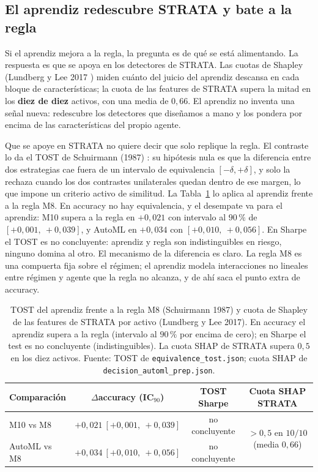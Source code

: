 \subsection{El aprendiz redescubre STRATA y bate a la regla}
\label{sec:mp-panel-tost}

Si el aprendiz mejora a la regla, la pregunta es de qué se está alimentando. La respuesta es que se apoya en los detectores de STRATA. Las cuotas de Shapley (Lundberg y Lee 2017 \cite{lundberg2017}) miden cuánto del juicio del aprendiz descansa en cada bloque de características; la cuota de las features de STRATA supera la mitad en los \textbf{diez de diez} activos, con una media de $0{,}66$. El aprendiz no inventa una señal nueva: redescubre los detectores que diseñamos a mano y los pondera por encima de las características del propio agente.

Que se apoye en STRATA no quiere decir que solo replique la regla. El contraste lo da el TOST de Schuirmann (1987) \cite{schuirmann1987}: su hipótesis nula es que la diferencia entre dos estrategias cae fuera de un intervalo de equivalencia $[-\delta, +\delta]$, y solo la rechaza cuando los dos contrastes unilaterales quedan dentro de ese margen, lo que impone un criterio activo de similitud. La Tabla~\ref{tab:mp-tost} lo aplica al aprendiz frente a la regla M8. En accuracy no hay equivalencia, y el desempate va para el aprendiz: M10 supera a la regla en $+0{,}021$ con intervalo al $90\,\%$ de $[+0{,}001,\ +0{,}039]$, y AutoML en $+0{,}034$ con $[+0{,}010,\ +0{,}056]$. En Sharpe el TOST es no concluyente: aprendiz y regla son indistinguibles en riesgo, ninguno domina al otro. El mecanismo de la diferencia es claro. La regla M8 es una compuerta fija sobre el régimen; el aprendiz modela interacciones no lineales entre régimen y agente que la regla no alcanza, y de ahí saca el punto extra de accuracy.

\begin{table}[htbp]
\centering
\caption{TOST del aprendiz frente a la regla M8 (Schuirmann 1987) y cuota de Shapley de las features de STRATA por activo (Lundberg y Lee 2017). En accuracy el aprendiz supera a la regla (intervalo al $90\,\%$ por encima de cero); en Sharpe el test es no concluyente (indistinguibles). La cuota SHAP de STRATA supera $0{,}5$ en los diez activos. Fuente: TOST de \texttt{equivalence\_tost.json}; cuota SHAP de \texttt{decision\_automl\_prep.json}.}
\label{tab:mp-tost}
\begin{tabular}{lccc}
\toprule
Comparación & $\Delta$accuracy (IC$_{90}$) & TOST Sharpe & Cuota SHAP STRATA \\
\midrule
M10 vs M8     & $+0{,}021\ [+0{,}001,\ +0{,}039]$ & no concluyente & \multirow{2}{*}{$>0{,}5$ en $10/10$ (media $0{,}66$)} \\
AutoML vs M8  & $+0{,}034\ [+0{,}010,\ +0{,}056]$ & no concluyente & \\
\bottomrule
\end{tabular}
\end{table}

